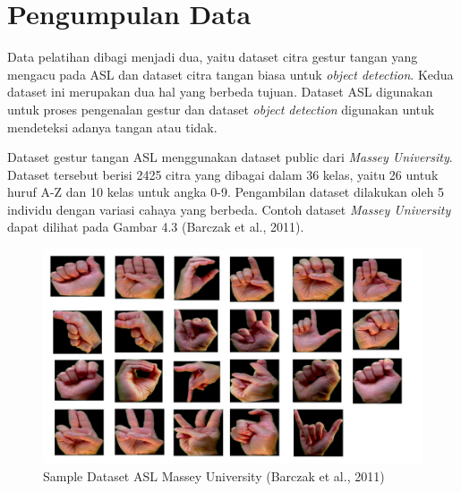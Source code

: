 \section{Pengumpulan Data}
Data pelatihan dibagi menjadi dua, yaitu dataset citra gestur tangan yang mengacu pada ASL dan dataset citra tangan biasa untuk \emph{object detection}.
Kedua dataset ini merupakan dua hal yang berbeda tujuan. 
Dataset ASL digunakan untuk proses pengenalan gestur dan dataset \emph{object detection} digunakan untuk mendeteksi adanya tangan atau tidak.

Dataset gestur tangan ASL menggunakan dataset public dari \emph{Massey University}. Dataset tersebut berisi 2425 citra yang dibagai dalam 36 kelas, yaitu 26 untuk huruf A-Z dan 10 kelas untuk angka 0-9. Pengambilan dataset dilakukan oleh 5 individu dengan variasi cahaya yang berbeda. Contoh dataset \emph{Massey University} dapat dilihat pada Gambar 4.3 (Barczak et al., 2011).
\begin{figure}[H]
	\centering
	\includegraphics[width=0.8\linewidth]{datasetasl}
	\caption{Sample Dataset ASL Massey University (Barczak et al., 2011)}
	\label{fig:datasetasl}
\end{figure}

